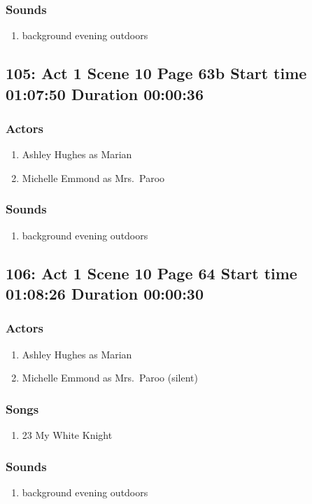 \subsubsection{Sounds}
\begin{enumerate}
\item background evening outdoors
\end{enumerate}
\subsection{105: Act 1 Scene 10 Page 63b Start time 01:07:50 Duration 00:00:36}

\subsubsection{Actors}
\begin{enumerate}
\item Ashley Hughes as Marian
\item Michelle Emmond as Mrs.~Paroo
\end{enumerate}

\subsubsection{Sounds}
\begin{enumerate}
\item background evening outdoors
\end{enumerate}
\subsection{106: Act 1 Scene 10 Page 64 Start time 01:08:26 Duration 00:00:30}

\subsubsection{Actors}
\begin{enumerate}
\item Ashley Hughes as Marian
\item Michelle Emmond as Mrs.~Paroo (silent)
\end{enumerate}

\subsubsection{Songs}
\begin{enumerate}
\item 23 My White Knight
\end{enumerate}\subsubsection{Sounds}
\begin{enumerate}
\item background evening outdoors
\end{enumerate}
